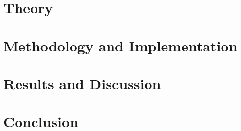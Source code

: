 \documentclass[UKenglish]{ifimaster}  %
\begin{document}
\part{Theory}                    %





\part{Methodology and Implementation}



\part{Results and Discussion}

\part{Conclusion}

\backmatter{}
\printbibliography
\end{document}
